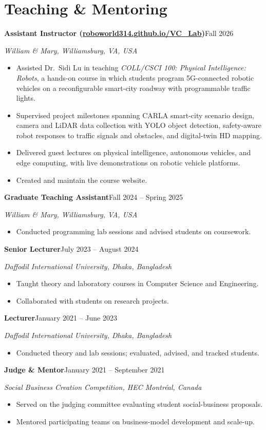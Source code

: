 \documentclass[11pt,letterpaper]{article}
\newcommand{\cventry}[4]{%
  \textbf{#1}\hfill #2\par\nobreak
  \textit{#3}\hfill #4\par}
\newcommand{\entrygap}{\par\vspace{5.5pt}}
\begin{document}
\section{Teaching \& Mentoring}
\cventry{Assistant Instructor \textnormal{(\href{https://roboworld314.github.io/VC_Lab/}{roboworld314.github.io/VC\_Lab})}}{Fall 2026}
        {William \& Mary, Williamsburg, VA, USA}{}
\begin{itemize}
  \item Assisted Dr.~Sidi Lu in teaching \textit{COLL/CSCI 100: Physical
        Intelligence: Robots}, a hands-on course in which students program
        5G-connected robotic vehicles on a reconfigurable smart-city roadway
        with programmable traffic lights.
  \item Supervised project milestones spanning CARLA smart-city scenario
        design, camera and LiDAR data collection with YOLO object detection,
        safety-aware robot responses to traffic signals and obstacles, and
        digital-twin HD mapping.
  \item Delivered guest lectures on physical intelligence, autonomous vehicles,
        and edge computing, with live demonstrations on robotic vehicle
        platforms.
  \item Created and maintain the course website.
\end{itemize}
\entrygap
\cventry{Graduate Teaching Assistant}{Fall 2024 -- Spring 2025}
        {William \& Mary, Williamsburg, VA, USA}{}
\begin{itemize}
  \item Conducted programming lab sessions and advised students on coursework.
\end{itemize}
\entrygap
\cventry{Senior Lecturer}{July 2023 -- August 2024}
        {Daffodil International University, Dhaka, Bangladesh}{}
\begin{itemize}
  \item Taught theory and laboratory courses in Computer Science and Engineering.
  \item Collaborated with students on research projects.
\end{itemize}
\entrygap
\cventry{Lecturer}{January 2021 -- June 2023}
        {Daffodil International University, Dhaka, Bangladesh}{}
\begin{itemize}
  \item Conducted theory and lab sessions; evaluated, advised, and tracked students.
\end{itemize}
\entrygap
\cventry{Judge \& Mentor}{January 2021 -- September 2021}
        {Social Business Creation Competition, HEC Montr\'eal, Canada}{}
\begin{itemize}
  \item Served on the judging committee evaluating student social-business
        proposals.
  \item Mentored participating teams on business-model development and
        scale-up.
\end{itemize}
\end{document}
